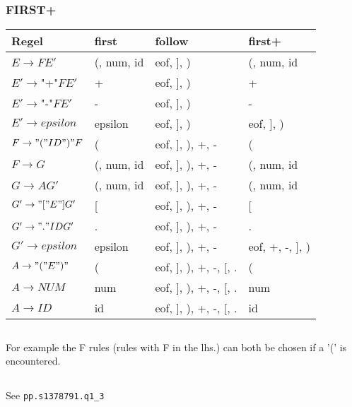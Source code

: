 \subsubsection{FIRST+}
\begin{tabular}{llll}
 Regel & first &  follow &  first+ \\
\hline
$E  \rightarrow F E'          $ & (, num, id    & eof, ], )              & (, num, id \\
$E' \rightarrow $"+"$ F E'    $ & +             & eof, ], )              & + \\
$E' \rightarrow $"-"$ F E'    $ & -             & eof, ], )              & - \\
$E' \rightarrow epsilon       $ & epsilon       & eof, ], )              & eof, ], ) \\
$F  \rightarrow "(" ID ")" F  $ & (             & eof, ], ), +, -        & ( \\
$F  \rightarrow G             $ & (, num, id    & eof, ], ), +, -        & (, num, id \\
$G  \rightarrow A G'          $ & (, num, id    & eof, ], ), +, -        & (, num, id \\
$G' \rightarrow "[" E "] G'   $ & [             & eof, ], ), +, -        & [ \\
$G' \rightarrow "." ID G'     $ & .             & eof, ], ), +, -        & . \\
$G' \rightarrow epsilon       $ & epsilon       & eof, ], ), +, -        & eof, +, -, ], ) \\
$A  \rightarrow "(" E ")"     $ & (             & eof, ], ), +, -, [, .  & ( \\
$A  \rightarrow NUM           $ & num           & eof, ], ), +, -, [, .  & num \\
$A  \rightarrow ID            $ & id            & eof, ], ), +, -, [, .  &  id \\
\end{tabular}

\subsection{}
For example the F rules (rules with F in the lhs.) can both be chosen if a '(' is encountered.

\subsection{}
See \texttt{pp.s1378791.q1\_3}